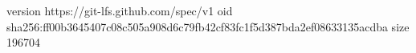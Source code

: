 version https://git-lfs.github.com/spec/v1
oid sha256:ff00b3645407c08c505a908d6c79fb42cf83fc1f5d387bda2ef08633135acdba
size 196704
